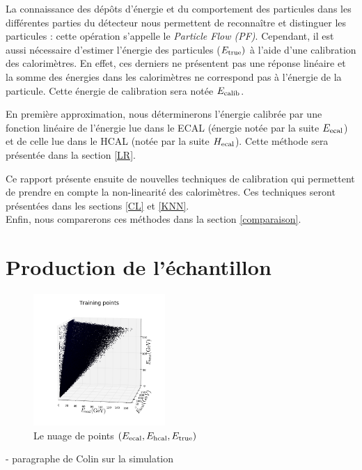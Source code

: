 \documentclass[11pt,a4paper]{article}
\begin{document}
La connaissance des dépôts d'énergie et du comportement des particules dans les différentes parties du détecteur nous permettent de reconnaître et distinguer les particules : cette opération s'appelle le \textit{Particle Flow (PF)}. Cependant, il est aussi nécessaire d'estimer l'énergie des particules ($E_{\rm true})$ à l'aide d'une calibration des calorimètres. En effet, ces derniers ne présentent pas une réponse linéaire et la somme des énergies dans les calorimètres ne correspond pas à l'énergie de la particule. Cette énergie de calibration sera notée $E_{\rm calib}$.

En première approximation, nous déterminerons l'énergie calibrée par une fonction linéaire de l'énergie lue dans le ECAL (énergie notée par la suite $E_{\rm ecal}$) et de celle lue dans le HCAL (notée par la suite $H_{\rm ecal}$). Cette méthode sera présentée dans la section \ref{LR}.

Ce rapport présente ensuite de nouvelles techniques de calibration qui permettent de prendre en compte la non-linearité des calorimètres. Ces techniques seront présentées dans les sections \ref{CL} et \ref{KNN}.\\
Enfin, nous comparerons ces méthodes dans la section \ref{comparaison}. 

\section{Production de l'échantillon}

\begin{figure}[!h]
\begin{center}
\includegraphics[height=5cm]{images/pictures/testLinearRegression/LinearRegression_plot3D_training.png}
\caption{Le nuage de points $(E_{\rm ecal},E_{\rm hcal}, E_{\rm true})$}
\end{center}
\end{figure}

- paragraphe de Colin sur la simulation\\
\end{document}
